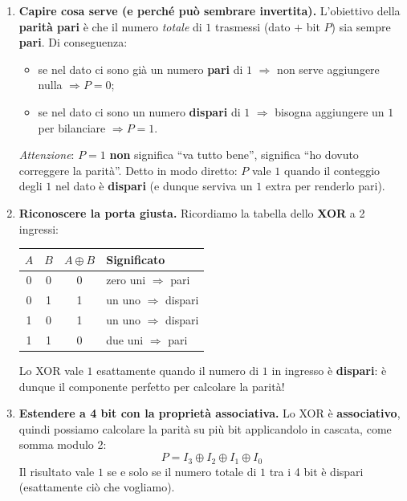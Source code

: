 \documentclass[11pt,a4paper]{report}
\begin{document}
\begin{enumerate}[leftmargin=1.5em]
    \item \textbf{Capire cosa serve (e perché può sembrare invertita).}
    L'obiettivo della \textbf{parità pari} è che il numero \emph{totale} di $1$ trasmessi (dato $+$ bit $P$) sia sempre \textbf{pari}. Di conseguenza:
    \begin{itemize}
        \item se nel dato ci sono già un numero \textbf{pari} di $1$ $\Rightarrow$ non serve aggiungere nulla $\Rightarrow P = 0$;
        \item se nel dato ci sono un numero \textbf{dispari} di $1$ $\Rightarrow$ bisogna aggiungere un $1$ per bilanciare $\Rightarrow P = 1$.
    \end{itemize}
    \textit{Attenzione}: $P = 1$ \textbf{non} significa ``va tutto bene'', significa ``ho dovuto correggere la parità''. Detto in modo diretto: $P$ vale $1$ quando il conteggio degli $1$ nel dato è \textbf{dispari} (e dunque serviva un $1$ extra per renderlo pari).

    \item \textbf{Riconoscere la porta giusta.} Ricordiamo la tabella dello \textbf{XOR} a 2 ingressi:
    \begin{center}
    \begin{tabular}{cc|c|l}
    \toprule
    $A$ & $B$ & $A \oplus B$ & Significato \\
    \midrule
    0 & 0 & 0 & zero uni $\Rightarrow$ pari \\
    0 & 1 & 1 & un uno $\Rightarrow$ dispari \\
    1 & 0 & 1 & un uno $\Rightarrow$ dispari \\
    1 & 1 & 0 & due uni $\Rightarrow$ pari \\
    \bottomrule
    \end{tabular}
    \end{center}
    Lo XOR vale $1$ esattamente quando il numero di $1$ in ingresso è \textbf{dispari}: è dunque il componente perfetto per calcolare la parità!

    \item \textbf{Estendere a 4 bit con la proprietà associativa.} Lo XOR è \textbf{associativo}, quindi possiamo calcolare la parità su più bit applicandolo in cascata, come somma modulo 2:
    \[
        P = I_3 \oplus I_2 \oplus I_1 \oplus I_0
    \]
    Il risultato vale $1$ se e solo se il numero totale di $1$ tra i 4 bit è dispari (esattamente ciò che vogliamo).


\end{enumerate}
\end{document}
